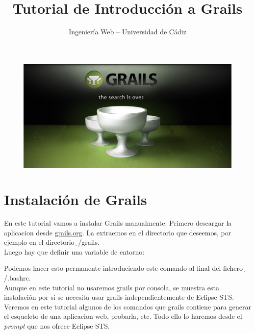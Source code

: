 \documentclass[a4paper,12pt,spanish]{article}
\author{Ingeniería Web -- Universidad de Cádiz}
\title{Tutorial de Introducción a Grails}
\newcommand{\urltilde}{$_{\widetilde{~}}$}
\begin{document}
\begin{titlepage}
  \maketitle
  \begin{figure}[h!]
    \centering
    \vspace{0.2in}
    \includegraphics[scale=0.35]{grailsportada}
    \label{fig:Portada}
  \end{figure}
  \tableofcontents
\end{titlepage}
 

\newpage 

\section{Instalación de Grails}

En este tutorial vamos a instalar Grails manualmente. Primero descargar la aplicacion desde \href{http://grails.org/Download}{grails.org}. La extraemos en el directorio que deseemos, por ejemplo en el directorio \urltilde/grails.\\

Luego hay que definir una variable de entorno:

Podemos hacer esto permanente introduciendo este comando al final del fichero  \urltilde/.bashrc.\\

Aunque en este tutorial no usaremos grails por consola, se muestra esta instalación por si se necesita usar grails independientemente de Eclipse STS. Veremos en este tutorial algunos de los comandos que grails contiene para generar el esqueleto de una aplicacion web, probarla, etc. Todo ello lo haremos desde el {\it prompt} que nos ofrece Eclipse STS.
\end{document}
